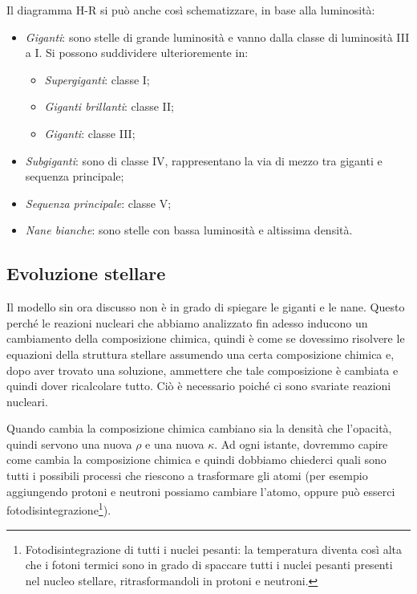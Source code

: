 Il diagramma H-R si può anche così schematizzare, in base alla luminosità:

\begin{itemize}
    \item \textit{Giganti}: sono stelle di grande luminosità e vanno dalla classe di luminosità III a I. Si possono suddividere ulterioremente in:
    \begin{itemize}
        \item \textit{Supergiganti}: classe I;
        \item \textit{Giganti brillanti}: classe II;
        \item \textit{Giganti}: classe III;
    \end{itemize}
    \item \textit{Subgiganti}: sono di classe IV, rappresentano la via di mezzo tra giganti e sequenza principale;
    \item \textit{Sequenza principale}: classe V;
    \item \textit{Nane bianche}: sono stelle con bassa luminosità e altissima densità.
\end{itemize}


\subsection{Evoluzione stellare}
Il modello sin ora discusso non è in grado di spiegare le giganti e le nane. Questo perché le reazioni nucleari che abbiamo analizzato fin adesso inducono un cambiamento della composizione chimica, quindi è come se dovessimo risolvere le equazioni della struttura stellare assumendo una certa composizione chimica e, dopo aver trovato una soluzione, ammettere che tale composizione è cambiata e quindi dover ricalcolare tutto. Ciò è necessario poiché ci sono svariate reazioni nucleari.

Quando cambia la composizione chimica cambiano sia la densità che l'opacità, quindi servono una nuova $\rho$ e una nuova $\kappa$. Ad ogni istante, dovremmo capire come cambia la composizione chimica e quindi dobbiamo chiederci quali sono tutti i possibili processi che riescono a trasformare gli atomi (per esempio aggiungendo protoni e neutroni possiamo cambiare l'atomo, oppure può esserci fotodisintegrazione\footnote{Fotodisintegrazione di tutti i nuclei pesanti: la temperatura diventa così alta che i
fotoni termici sono in grado di spaccare tutti i nuclei pesanti presenti nel nucleo stellare,
ritrasformandoli in protoni e neutroni.}).

